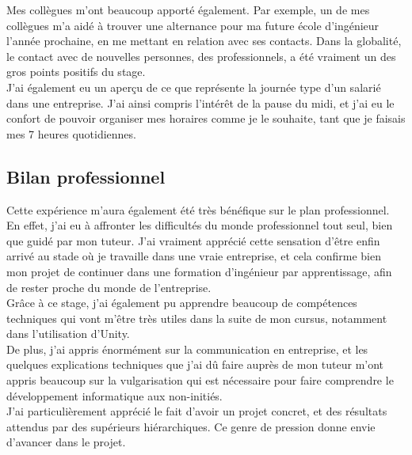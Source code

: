 \documentclass[a4paper]{article}
\begin{document}
        Mes collègues m'ont beaucoup apporté également. Par exemple, un de mes collègues m'a aidé à trouver une alternance pour ma future école d'ingénieur l'année prochaine, en me mettant en relation avec ses contacts. Dans la globalité, le contact avec de nouvelles personnes, des professionnels, a été vraiment un des gros points positifs du stage. \\

        J'ai également eu un aperçu de ce que représente la journée type d'un salarié dans une entreprise. J'ai ainsi compris l'intérêt de la pause du midi, et j'ai eu le confort de pouvoir organiser mes horaires comme je le souhaite, tant que je faisais mes 7 heures quotidiennes. \\

        \vfill

        \hrulefill

        \vfill

    \subsection{Bilan professionnel}

    Cette expérience m'aura également été très bénéfique sur le plan professionnel. En effet, j'ai eu à affronter les difficultés du monde professionnel tout seul, bien que guidé par mon tuteur. J'ai vraiment apprécié cette sensation d'être enfin arrivé au stade où je travaille dans une vraie entreprise, et cela confirme bien mon projet de continuer dans une formation d'ingénieur par apprentissage, afin de rester proche du monde de l'entreprise. \\

    Grâce à ce stage, j'ai également pu apprendre beaucoup de compétences techniques qui vont m'être très utiles dans la suite de mon cursus, notamment dans l'utilisation d'Unity. \\ 

    De plus, j'ai appris énormément sur la communication en entreprise, et les quelques explications techniques que j'ai dû faire auprès de mon tuteur m'ont appris beaucoup sur la vulgarisation qui est nécessaire pour faire comprendre le développement informatique aux non-initiés. \\ 

    J'ai particulièrement apprécié le fait d'avoir un projet concret, et des résultats attendus par des supérieurs hiérarchiques. Ce genre de pression donne envie d'avancer dans le projet. \\
    
\end{document}
